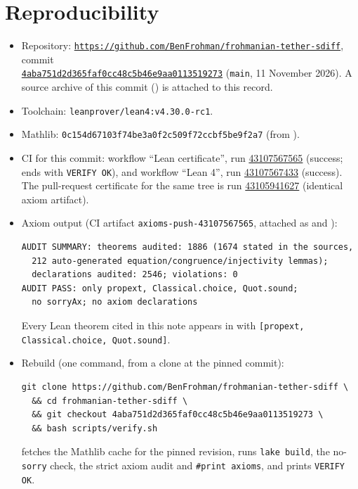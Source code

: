 \documentclass[11pt]{article}
\newcommand{\pin}{4aba751d2d365faf0cc48c5b46e9aa0113519273}
\newcommand{\repo}{https://github.com/BenFrohman/frohmanian-tether-sdiff}
\begin{document}
\section{Reproducibility}\label{sec:repro}
\begin{itemize}
\item Repository: \href{\repo}{\nolinkurl{https://github.com/BenFrohman/frohmanian-tether-sdiff}},
commit\\ \href{\repo/tree/\pin}{\texttt{\pin}} (\texttt{main}, 11 November 2026).
A source archive of this commit () is attached to this record.
\item Toolchain: \texttt{leanprover/lean4:v4.30.0-rc1}.
\item Mathlib: \texttt{0c154d67103f74be3a0f2c509f72ccbf5be9f2a7} (from ).
\item CI for this commit: workflow ``Lean certificate'', run
\href{https://github.com/BenFrohman/frohmanian-tether-sdiff/actions/runs/43107567565}{43107567565}
(success; ends with \texttt{VERIFY OK}), and workflow ``Lean 4'', run
\href{https://github.com/BenFrohman/frohmanian-tether-sdiff/actions/runs/43107567433}{43107567433}
(success). The pull-request certificate for the same tree is run
\href{https://github.com/BenFrohman/frohmanian-tether-sdiff/actions/runs/43105941627}{43105941627}
(identical axiom artifact).
\item Axiom output (CI artifact \texttt{axioms-push-43107567565}, attached as
 and ):
\begin{Verbatim}
AUDIT SUMMARY: theorems audited: 1886 (1674 stated in the sources,
  212 auto-generated equation/congruence/injectivity lemmas);
  declarations audited: 2546; violations: 0
AUDIT PASS: only propext, Classical.choice, Quot.sound;
  no sorryAx; no axiom declarations
\end{Verbatim}
Every Lean theorem cited in this note appears in  with
\texttt{[propext, Classical.choice, Quot.sound]}.
\item Rebuild (one command, from a clone at the pinned commit):
\begin{Verbatim}
git clone https://github.com/BenFrohman/frohmanian-tether-sdiff \
  && cd frohmanian-tether-sdiff \
  && git checkout 4aba751d2d365faf0cc48c5b46e9aa0113519273 \
  && bash scripts/verify.sh
\end{Verbatim}
\file{scripts/verify.sh} fetches the Mathlib cache for the pinned revision, runs \texttt{lake build},
the no-\texttt{sorry} check, the strict axiom audit and \texttt{\#print axioms}, and prints
\texttt{VERIFY OK}.
\end{itemize}
\end{document}
